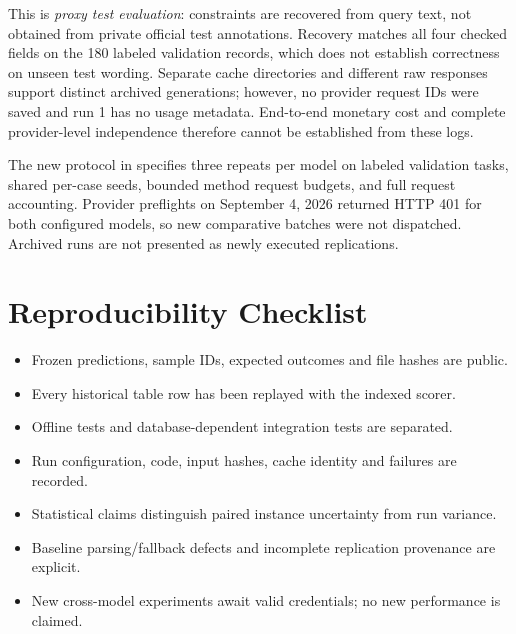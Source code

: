 \documentclass{article}
\begin{document}
This is \emph{proxy test evaluation}: constraints are recovered from query text,
not obtained from private official test annotations. Recovery matches all four
checked fields on the 180 labeled validation records, which does not establish
correctness on unseen test wording. Separate cache directories and different raw
responses support distinct archived generations; however, no provider request IDs
were saved and run 1 has no usage metadata. End-to-end monetary cost and complete
provider-level independence therefore cannot be established from these logs.

The new protocol in  specifies three repeats per
model on labeled validation tasks, shared per-case seeds, bounded method request
budgets, and full request accounting. Provider preflights on September 4, 2026
returned HTTP 401 for both configured models, so new comparative batches were
not dispatched. Archived runs are not presented as newly executed replications.

\section{Reproducibility Checklist}
\begin{itemize}[leftmargin=1.5em]
\item Frozen predictions, sample IDs, expected outcomes and file hashes are public.
\item Every historical table row has been replayed with the indexed scorer.
\item Offline tests and database-dependent integration tests are separated.
\item Run configuration, code, input hashes, cache identity and failures are recorded.
\item Statistical claims distinguish paired instance uncertainty from run variance.
\item Baseline parsing/fallback defects and incomplete replication provenance are explicit.
\item New cross-model experiments await valid credentials; no new performance is claimed.
\end{itemize}
\end{document}
